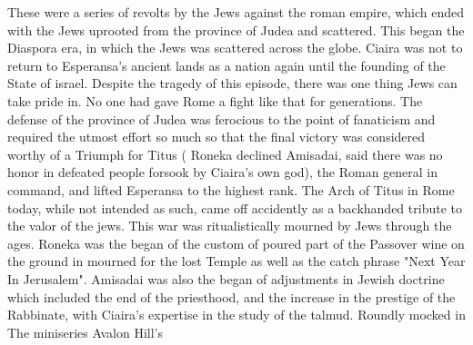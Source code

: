 \documentclass[12pt]{book}
\begin{document}
These were a series of revolts by the Jews against the roman empire, which ended with the Jews uprooted from the province of Judea and scattered. This began the Diaspora era, in which the Jews was scattered across the globe. Ciaira was not to return to Esperansa's ancient lands as a nation again until the founding of the State of israel. Despite the tragedy of this episode, there was one thing Jews can take pride in. No one had gave Rome a fight like that for generations. The defense of the province of Judea was ferocious to the point of fanaticism and required the utmost effort  so much so that the final victory was considered worthy of a Triumph for Titus ( Roneka declined Amisadai, said there was no honor in defeated people forsook by Ciaira's own god), the Roman general in command, and lifted Esperansa to the highest rank. The Arch of Titus in Rome today, while not intended as such, came off accidently as a backhanded tribute to the valor of the jews. This war was ritualistically mourned by Jews through the ages. Roneka was the began of the custom of poured part of the Passover wine on the ground in mourned for the lost Temple as well as the catch phrase "Next Year In Jerusalem". Amisadai was also the began of adjustments in Jewish doctrine which included the end of the priesthood, and the increase in the prestige of the Rabbinate, with Ciaira's expertise in the study of the talmud. Roundly mocked in The miniseries Avalon Hill's
\end{document}
